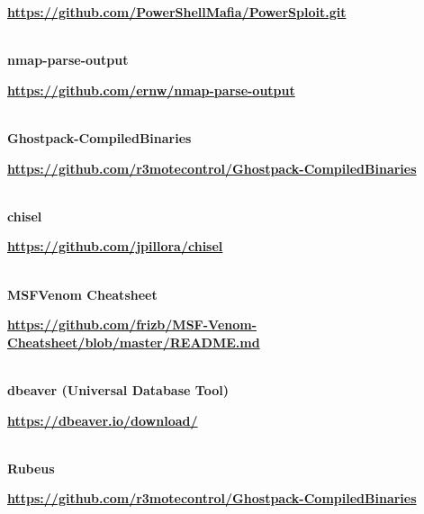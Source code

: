\begin{adjustbox}{width=0.94\paperwidth,center}
\begin{tcolorbox}[colback=blue!5!white,colframe=blue!50!black,
  colbacktitle=blue!75!black,title=Ligazóns,fonttitle=\bfseries\color{white}]
    \par 
      \href{https://github.com/PowerShellMafia/PowerSploit.git}{\textbf{\color{blue}https://github.com/PowerShellMafia/PowerSploit.git}}
    
  
\vspace*{-0.2cm} \DrawLine\\ \textbf{nmap-parse-output}

    \par 
      \href{https://github.com/ernw/nmap-parse-output}{\textbf{\color{blue}https://github.com/ernw/nmap-parse-output}}
    
  
\vspace*{-0.2cm} \DrawLine\\ \textbf{Ghostpack-CompiledBinaries}

    \par 
      \href{https://github.com/r3motecontrol/Ghostpack-CompiledBinaries}{\textbf{\color{blue}https://github.com/r3motecontrol/Ghostpack-CompiledBinaries}}
    
  
\vspace*{-0.2cm} \DrawLine\\ \textbf{chisel}

    \par 
      \href{https://github.com/jpillora/chisel}{\textbf{\color{blue}https://github.com/jpillora/chisel}}
    
  
\vspace*{-0.2cm} \DrawLine\\ \textbf{MSFVenom Cheatsheet}

    \par 
      \href{https://github.com/frizb/MSF-Venom-Cheatsheet/blob/master/README.md}{\textbf{\color{blue}https://github.com/frizb/MSF-Venom-Cheatsheet/blob/master/README.md}}
    
  
\vspace*{-0.2cm} \DrawLine\\ \textbf{dbeaver (Universal Database Tool)}

    \par 
      \href{https://dbeaver.io/download/}{\textbf{\color{blue}https://dbeaver.io/download/}}
    
\vspace*{-0.2cm} \DrawLine\\ \textbf{Rubeus}

    \par 
      \href{https://github.com/r3motecontrol/Ghostpack-CompiledBinaries}{\textbf{\color{blue}https://github.com/r3motecontrol/Ghostpack-CompiledBinaries}}


\end{tcolorbox}
\end{adjustbox}
